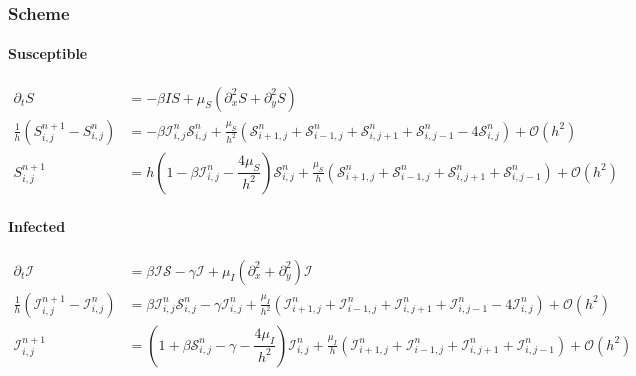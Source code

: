 \subsubsection{Scheme}

\paragraph{Susceptible}

\begin{align*}
  \partial_t S                                        & = -\beta IS + \mu_S \left(\partial_x^2 S + \partial_y^2 S\right)                                                                                                                                                                       \\
  \frac{1}{h}\left(S_{i, j}^{n+1} - S_{i, j}^n\right) & =  - \beta \mathcal{I}_{i,j}^n \mathcal{S}_{i,j}^n +  \frac{\mu_S}{h^2} \left(\mathcal{S}_{i+1,j}^n + \mathcal{S}_{i-1,j}^n + \mathcal{S}_{i,j+1}^n + \mathcal{S}_{i,j-1}^n - 4\mathcal{S}_{i,j}^n\right) + \mathcal{O}(h^2)           \\
  S_{i,j}^{n+1}                                       & = h \left(1 - \beta\mathcal{I}_{i,j}^n - \dfrac{4\mu_S}{h^2}\right)\mathcal{S}_{i,j}^n + \frac{\mu_S}{h} \left(\mathcal{S}_{i+1,j}^n + \mathcal{S}_{i-1,j}^n + \mathcal{S}_{i,j+1}^n + \mathcal{S}_{i,j-1}^n\right) + \mathcal{O}(h^2)
\end{align*}



\clearpage
\paragraph{Infected}
\noindent
\begin{align*}
  \partial_t \mathcal{I}                                                & = \beta \mathcal{I}\mathcal{S} - \gamma \mathcal{I} + \mu_I \left(\partial_x^2 + \partial_y^2\right)\mathcal{I}                                                                                                                                      \\
  \frac{1}{h}\left(\mathcal{I}_{i,j}^{n+1} - \mathcal{I}_{i,j}^n\right) & = \beta \mathcal{I}_{i,j}^n \mathcal{S}_{i,j}^n - \gamma \mathcal{I}_{i,j}^n + \frac{\mu_I}{h^2}\left(\mathcal{I}_{i+1,j}^n + \mathcal{I}_{i-1,j}^n + \mathcal{I}_{i,j+1}^n + \mathcal{I}_{i,j-1}^n - 4\mathcal{I}_{i,j}^n\right) + \mathcal{O}(h^2) \\
  \mathcal{I}_{i,j}^{n+1}                                               & = \left(1 + \beta\mathcal{S}_{i,j}^n - \gamma - \dfrac{4\mu_I}{h^2}\right)\mathcal{I}_{i,j}^n + \frac{\mu_I}{h}\left(\mathcal{I}_{i+1,j}^n + \mathcal{I}_{i-1,j}^n + \mathcal{I}_{i,j+1}^n + \mathcal{I}_{i,j-1}^n\right) + \mathcal{O}(h^2)
\end{align*}

